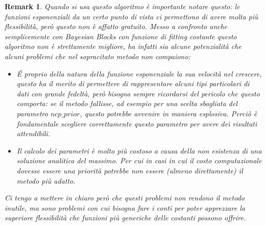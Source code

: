 \documentclass[10pt,a4paper]{report}
\newtheorem{remark}{Remark}
\begin{document}
\begin{remark}
Quando si usa questo algoritmo è importante notare questo: le funzioni esponenziali da un certo punto di vista ci permettono di avere molta più flessibilità, però questo non è affatto gratuito. Messo a confronto anche semplicemente con Bayesian Blocks con funzione di fitting costante questo algoritmo non è strettamente migliore, ha infatti sia alcune potenzialità che alcuni problemi che nel sopracitato metodo non compaiono:
\begin{itemize}
\item \'E proprio della natura della funzione esponenziale la sua velocità nel crescere, questo ha il merito di permettere di rappresentare alcuni tipi particolari di dati con grande fedeltà, però bisogna sempre ricordarsi del pericolo che questo comporta: se il metodo fallisse, ad esempio per una scelta sbagliata del parametro $ncp\_prior$, questo potrebbe avvenire in maniera esplosiva. Perciò è fondamentale scegliere correttamente questo parametro per avere dei risultati attendibili.
\item Il calcolo dei parametri è molto più costoso a causa della non esistenza di una soluzione analitica del massimo. Per cui in casi in cui il costo computazionale dovesse essere una priorità potrebbe non essere (almeno direttamente) il metodo più adatto.
\end{itemize}
Ci tengo a mettere in chiaro però che questi problemi non rendono il metodo inutile, ma sono problemi con cui bisogna fare i conti per poter apprezzare la superiore flessibilità che funzioni più generiche delle costanti possono offrire.
\end{remark}
\end{document}
